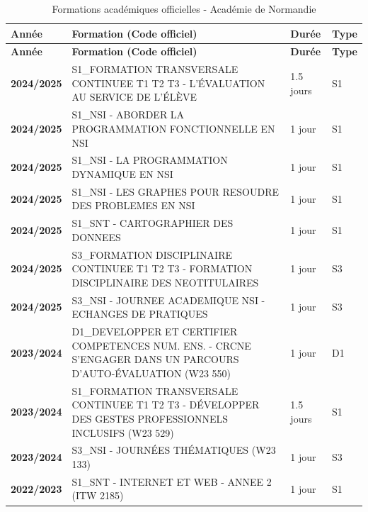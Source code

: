 \begin{longtable}{|p{2cm}|p{10cm}|p{2cm}|p{1.5cm}|}
\caption{Formations académiques officielles - Académie de Normandie} \\
\hline
\textbf{Année} & \textbf{Formation (Code officiel)} & \textbf{Durée} & \textbf{Type} \\
\hline
\endfirsthead
\hline
\textbf{Année} & \textbf{Formation (Code officiel)} & \textbf{Durée} & \textbf{Type} \\
\hline
\endhead

\textbf{2024/2025} & S1\_FORMATION TRANSVERSALE CONTINUEE T1 T2 T3 - L'ÉVALUATION AU SERVICE DE L'ÉLÈVE & 1.5 jours & S1 \\
\hline

\textbf{2024/2025} & S1\_NSI - ABORDER LA PROGRAMMATION FONCTIONNELLE EN NSI & 1 jour & S1 \\
\hline

\textbf{2024/2025} & S1\_NSI - LA PROGRAMMATION DYNAMIQUE EN NSI & 1 jour & S1 \\
\hline

\textbf{2024/2025} & S1\_NSI - LES GRAPHES POUR RESOUDRE DES PROBLEMES EN NSI & 1 jour & S1 \\
\hline

\textbf{2024/2025} & S1\_SNT - CARTOGRAPHIER DES DONNEES & 1 jour & S1 \\
\hline

\textbf{2024/2025} & S3\_FORMATION DISCIPLINAIRE CONTINUEE T1 T2 T3 - FORMATION DISCIPLINAIRE DES NEOTITULAIRES & 1 jour & S3 \\
\hline

\textbf{2024/2025} & S3\_NSI - JOURNEE ACADEMIQUE NSI - ECHANGES DE PRATIQUES & 1 jour & S3 \\
\hline

\textbf{2023/2024} & D1\_DEVELOPPER ET CERTIFIER COMPETENCES NUM. ENS. - CRCNE S'ENGAGER DANS UN PARCOURS D'AUTO-ÉVALUATION (W23 550) & 1 jour & D1 \\
\hline

\textbf{2023/2024} & S1\_FORMATION TRANSVERSALE CONTINUEE T1 T2 T3 - DÉVELOPPER DES GESTES PROFESSIONNELS INCLUSIFS (W23 529) & 1.5 jours & S1 \\
\hline

\textbf{2023/2024} & S3\_NSI - JOURNÉES THÉMATIQUES (W23 133) & 1 jour & S3 \\
\hline

\textbf{2022/2023} & S1\_SNT - INTERNET ET WEB - ANNEE 2 (ITW 2185) & 1 jour & S1 \\
\hline


\end{longtable}
